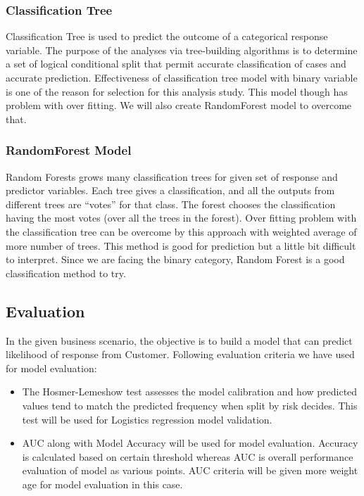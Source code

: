 \documentclass[english,floatsintext,man]{apa6}
\begin{document}
\subsubsection{Classification Tree}\label{classification-tree}

Classification Tree is used to predict the outcome of a categorical
response variable. The purpose of the analyses via tree-building
algorithms is to determine a set of logical conditional split that
permit accurate classification of cases and accurate prediction.
Effectiveness of classification tree model with binary variable is one
of the reason for selection for this analysis study. This model though
has problem with over fitting. We will also create RandomForest model to
overcome that.

\subsubsection{RandomForest Model}\label{randomforest-model}

Random Forests grows many classification trees for given set of response
and predictor variables. Each tree gives a classification, and all the
outputs from different trees are \enquote{votes} for that class. The
forest chooses the classification having the most votes (over all the
trees in the forest). Over fitting problem with the classification tree
can be overcome by this approach with weighted average of more number of
trees. This method is good for prediction but a little bit difficult to
interpret. Since we are facing the binary category, Random Forest is a
good classification method to try.

\subsection{Evaluation}\label{evaluation}

In the given business scenario, the objective is to build a model that
can predict likelihood of response from Customer. Following evaluation
criteria we have used for model evaluation:

\begin{itemize}
\item
  The Hosmer-Lemeshow test assesses the model calibration and how
  predicted values tend to match the predicted frequency when split by
  risk decides. This test will be used for Logistics regression model
  validation.
\item
  AUC along with Model Accuracy will be used for model evaluation.
  Accuracy is calculated based on certain threshold whereas AUC is
  overall performance evaluation of model as various points. AUC
  criteria will be given more weight age for model evaluation in this
  case.
\end{itemize}
\end{document}
